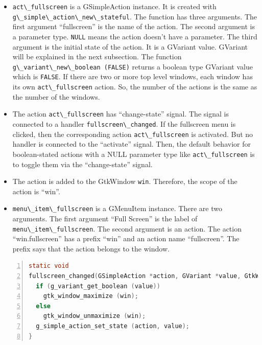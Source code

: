 \begin{itemize}
\tightlist
\item
  \passthrough{\lstinline!act\_fullscreen!} is a GSimpleAction instance.
  It is created with
  \passthrough{\lstinline!g\_simple\_action\_new\_stateful!}. The
  function has three arguments. The first argument ``fullscreen'' is the
  name of the action. The second argument is a parameter type.
  \passthrough{\lstinline!NULL!} means the action doesn't have a
  parameter. The third argument is the initial state of the action. It
  is a GVariant value. GVariant will be explained in the next
  subsection. The function
  \passthrough{\lstinline!g\_variant\_new\_boolean (FALSE)!} returns a
  boolean type GVariant value which is \passthrough{\lstinline!FALSE!}.
  If there are two or more top level windows, each window has its own
  \passthrough{\lstinline!act\_fullscreen!} action. So, the number of
  the actions is the same as the number of the windows.
\item
  The action \passthrough{\lstinline!act\_fullscreen!} has
  ``change-state'' signal. The signal is connected to a handler
  \passthrough{\lstinline!fullscreen\_changed!}. If the fullscreen menu
  is clicked, then the corresponding action
  \passthrough{\lstinline!act\_fullscreen!} is activated. But no handler
  is connected to the ``activate'' signal. Then, the default behavior
  for boolean-stated actions with a NULL parameter type like
  \passthrough{\lstinline!act\_fullscreen!} is to toggle them via the
  ``change-state'' signal.
\item
  The action is added to the GtkWindow \passthrough{\lstinline!win!}.
  Therefore, the scope of the action is ``win''.
\item
  \passthrough{\lstinline!menu\_item\_fullscreen!} is a GMenuItem
  instance. There are two arguments. The first argument ``Full Screen''
  is the label of \passthrough{\lstinline!menu\_item\_fullscreen!}. The
  second argument is an action. The action ``win.fullscreen'' has a
  prefix ``win'' and an action name ``fullscreen''. The prefix says that
  the action belongs to the window.
\end{itemize}

\begin{lstlisting}[language=C, numbers=left]
static void
fullscreen_changed(GSimpleAction *action, GVariant *value, GtkWindow *win) {
  if (g_variant_get_boolean (value))
    gtk_window_maximize (win);
  else
    gtk_window_unmaximize (win);
  g_simple_action_set_state (action, value);
}
\end{lstlisting}

